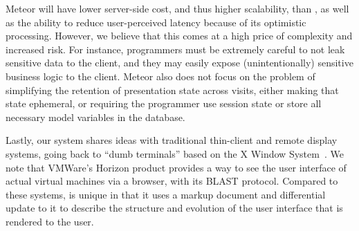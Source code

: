 Meteor will have lower server-side cost, and thus higher scalability, than \cb, as well
as the ability to reduce user-perceived latency because of its optimistic processing.
However, we believe that this comes at a high price of complexity and increased risk.
For instance, programmers must be extremely careful to not leak sensitive data to the 
client, and they may easily expose (unintentionally) sensitive business logic to the client.  
Meteor also does not focus on the problem of simplifying the retention of presentation
state across visits, either making that state ephemeral, or requiring the programmer
use session state or store all necessary model variables in the database.


Lastly, our system shares ideas with traditional thin-client and remote display 
systems, going back to ``dumb terminals'' based on the X Window 
System~\cite{ScheiflerGettys:acmtg1986}.  We note that VMWare's Horizon product provides
a way to see the user interface of actual virtual machines via a browser, with its
BLAST protocol.  Compared to these systems, \cb{} is 
unique in that it uses a markup document and differential update to it to 
describe the structure and evolution of the user interface that is rendered 
to the user.  
